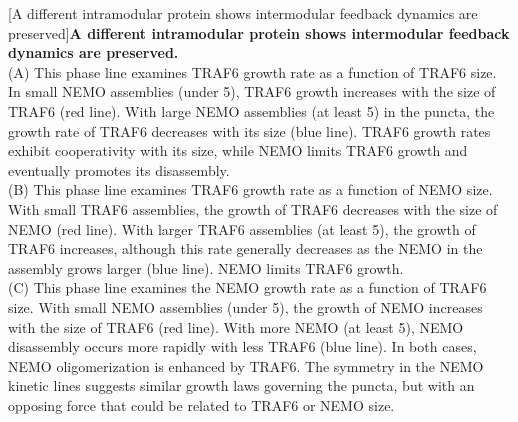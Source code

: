 \begin{centering}
\captionsetup{parbox=none}
[A different intramodular protein shows intermodular feedback dynamics are preserved]{\textbf{A different intramodular protein shows intermodular feedback dynamics are preserved.}
\vspace{1em}
\\
(A) This phase line examines TRAF6 growth rate as a function of TRAF6 size. In small NEMO assemblies (under 5\times), TRAF6 growth increases with the size of TRAF6 (red line). With large NEMO assemblies (at least 5\times) in the puncta, the growth rate of TRAF6 decreases with its size (blue line). TRAF6 growth rates exhibit cooperativity with its size, while NEMO limits TRAF6 growth and eventually promotes its disassembly.
\vspace{1em}
\\
(B) This phase line examines TRAF6 growth rate as a function of NEMO size. With small TRAF6 assemblies, the growth of TRAF6 decreases with the size of NEMO (red line). With larger TRAF6 assemblies (at least 5\times), the growth of TRAF6 increases, although this rate generally decreases as the NEMO in the assembly grows larger (blue line). NEMO limits TRAF6 growth.
\vspace{1em}
\\
(C) This phase line examines the NEMO growth rate as a function of TRAF6 size. With small NEMO assemblies (under 5\times), the growth of NEMO increases with the size of TRAF6 (red line). With more NEMO (at least 5\times), NEMO disassembly occurs more rapidly with less TRAF6 (blue line). In both cases, NEMO oligomerization is enhanced by TRAF6. The symmetry in the NEMO kinetic lines suggests similar growth laws governing the puncta, but with an opposing force that could be related to TRAF6 or NEMO size.
}
\end{centering}
